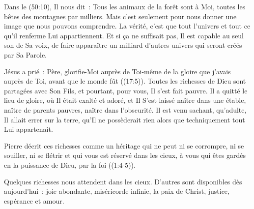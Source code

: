 
 Dans le (50:10), Il nous dit~: 
 \og Tous les animaux de la forêt sont à Moi,
 toutes les bêtes des montagnes par milliers. \fg{}
 Mais c'est seulement pour nous donner une image que nous pouvons comprendre.
 La vérité, c'est que tout l'univers et tout ce qu'il renferme
 Lui appartiennent. Et si ça ne suffisait pas, Il est capable au seul son
 de Sa voix, de faire apparaître un milliard d'autres univers
 qui seront créés par Sa Parole.

Jésus a prié~: 
 \og Père, glorifie-Moi auprès de Toi-même de la gloire
 que j'avais auprès de Toi, avant que le monde fût \fg{}
 ((17:5)).
 Toutes les richesses de Dieu sont partagées avec Son Fils, et pourtant,
 pour vous, Il s'est fait pauvre. Il a quitté le lieu de gloire,
 où Il était exalté et adoré, et Il S'est laissé naître dans une étable,
 naître de parents pauvres, naître dans l'obscurité.
 Il est venu sachant, qu'adulte, Il allait errer sur la terre,
 qu'Il ne possèderait rien alors que techniquement tout Lui appartenait.


Pierre décrit ces richesses comme \og un héritage qui ne peut ni se corrompre,
 ni se souiller, ni se flétrir et qui vous est réservé dans les cieux,
 à vous qui êtes gardés en la puissance de Dieu, par la foi \fg{}
 ((1:4-5)). 

Quelques richesses nous attendent dans les cieux.
 D'autres sont disponibles dès aujourd'hui~:
 joie abondante, miséricorde infinie, la paix de Christ,
 justice, espérance et amour.

\dvrule






